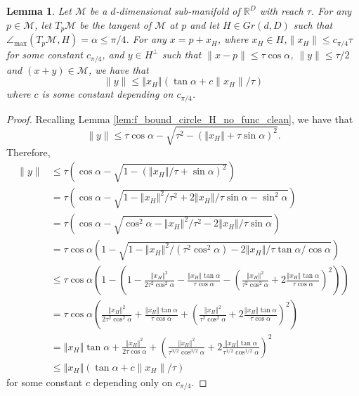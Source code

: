 \documentclass[12pt]{article}
\newtheorem{Lemma}[Theorem]{Lemma}
\theoremstyle{remark}
\newcommand{\RR}{\mathbb{R}}
\newcommand{\MM}{\mathcal{M}}
\newcommand{\norm}[1]{\left\Vert #1 \right\Vert}
\newcommand{\maxangle}{\angle_{\max}}
\begin{document}
\begin{appendices}
\begin{Lemma}\label{lem:f_bound_circle_H_no_func_ver2_clean}
    Let $\MM$ be a $d$-dimensional sub-manifold of $\RR^D$ with reach $\tau$. For any $p \in \MM$, let $T_{p}\MM$ be the tangent of $\MM$ at $p$ and let $ H\in Gr(d, D) $ such that $ \maxangle(T_p\MM, H) = \alpha  \leq \pi/4$.
    For any $x = p + x_H$, where $x_H\in H$,$\|x_H\|\leq c_{\pi/4}\tau$ for some constant $c_{\pi/4}$, and $y\in H^\perp$  such that $\|x-p\|\leq \tau \cos \alpha$, $\|y\| \leq \tau/2$ and $(x + y)\in \MM$, we have that 
	\[
	\|y\| \leq \norm{x_H}(\tan \alpha  +c\|x_H\|/\tau)
	\]
 where $c$ is some constant depending on $c_{\pi/4}$.
\end{Lemma}
\begin{proof}
 Recalling Lemma \ref{lem:f_bound_circle_H_no_func_clean}, we have that 
	\begin{equation}
	\|y\| \leq \tau \cos \alpha - \sqrt{\tau^2-(\norm{x_H}+\tau \sin \alpha)^2}
	.\end{equation}
	Therefore,
	\begin{align*}
	\|y\| &\leq \tau (\cos \alpha - \sqrt{1-(\norm{x_H}/\tau + \sin \alpha)^2})\\
	      &=  \tau (\cos \alpha - \sqrt{1-\norm{x_H}^2/\tau^2  + 2\norm{x_H}/\tau\sin \alpha - \sin^2\alpha})\\
	      &=  \tau (\cos \alpha - \sqrt{\cos^2\alpha-\norm{x_H}^2/\tau^2 - 2\norm{x_H}/\tau\sin \alpha })\\
	      &=  \tau \cos \alpha(1 - \sqrt{1-\norm{x_H}^2/(\tau^2\cos^2\alpha)  - 2\norm{x_H}/\tau\tan \alpha / \cos\alpha })\\
	      &\leq  \tau \cos \alpha (1 - (1-\frac{\norm{x_H}^2}{2\tau^2\cos^2\alpha}  - \frac{\norm{x_H}\tan \alpha}{\tau \cos\alpha}  - \left(\frac{\norm{x_H}^2}{\tau^2\cos^2\alpha}  + 2\frac{\norm{x_H}\tan \alpha}{\tau\cos\alpha} \right)^2))\\
	      &= \tau   \cos\alpha(\frac{\norm{x_H}^2}{2\tau^2\cos^2\alpha}  + \frac{\norm{x_H}\tan \alpha}{\tau\cos\alpha}  + \left(\frac{\norm{x_H}^2}{\tau^2\cos^2\alpha}  + 2\frac{\norm{x_H}\tan \alpha}{\tau\cos\alpha} \right)^2)\\
	      &= \norm{x_H}\tan \alpha  +\frac{\norm{x_H}^2}{2\tau\cos\alpha}  +  \left(\frac{\norm{x_H}^2}{\tau^{3/2}\cos^{3/2}\alpha}  + 2\frac{\norm{x_H}\tan \alpha}{\tau^{1/2}\cos^{1/2}\alpha} \right)^2\\
	      &\leq \norm{x_H} (\tan \alpha + c\|x_H\|/\tau)
	\end{align*}
	for some constant $c$ depending only on $c_{\pi/4}$.
\end{proof}


\end{appendices}
\end{document}
